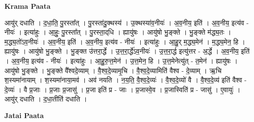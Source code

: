 \documentclass[17pt]{extarticle}
\begin{document}
\textbf{Krama Paata} \newline

आयु॑र् दधाति । द॒धा॒ति॒ पु॒रस्ता᳚त् । पु॒रस्ता॑दु॒क्थस्य॑ । उ॒क्थस्या॑व॒नीयः॑ । अ॒व॒नीय॒ इति॑ । अ॒व॒नीय॒ इत्य॑व - नीयः॑ । इत्या॑हुः । आ॒हुः॒ पु॒रस्ता᳚त् । पु॒रस्ता॒द्‌धि । ह्यायु॑षः । आयु॑षो भु॒ङ्‍क्ते । भु॒ङ्‍क्ते म॑द्ध्य॒तः । म॒द्ध्य॒तो॑ऽव॒नीयः॑ । अ॒व॒नीय॒ इति॑ । अ॒व॒नीय॒ इत्य॑व - नीयः॑ । इत्या॑हुः । आ॒हु॒र् म॒द्ध्य॒मेन॑ । म॒द्ध्य॒मेन॒ हि । ह्यायु॑षः । आयु॑षो भु॒ङ्‍क्ते । भु॒ङ्‍क्त उ॑त्तरा॒र्द्धे । उ॒त्त॒रा॒र्द्धे॑ऽव॒नीयः॑ । उ॒त्त॒रा॒र्द्ध इत्यु॑त्तर - अ॒र्द्धे । अ॒व॒नीय॒ इति॑ । अ॒व॒नीय॒ इत्य॑व - नीयः॑ । इत्या॑हुः । आ॒हु॒रु॒त्त॒मेन॑ । उ॒त्त॒मेन॒ हि । उ॒त्त॒मेनेत्यु॑त् - त॒मेन॑ । ह्यायु॑षः । आयु॑षो भु॒ङ्‍क्ते । भु॒ङ्‍क्ते वै᳚श्वदे॒व्याम् । वै॒श्व॒दे॒व्यामृ॒चि । वै॒श्व॒दे॒व्यामिति॑ वैश्व - दे॒व्याम् । ऋ॒चि श॒स्यमा॑नायाम् । श॒स्यमा॑नाया॒मव॑ । अव॑ नयति । न॒य॒ति॒ वै॒श्व॒दे॒व्यः॑ । वै॒श्व॒दे॒व्यो॑ वै । वै॒श्व॒दे॒व्य॑ इति॑ वैश्व - दे॒व्यः॑ । वै प्र॒जाः । प्र॒जाः प्र॒जासु॑ । प्र॒जा इति॑ प्र - जाः । प्र॒जास्वे॒व । प्र॒जास्विति॑ प्र - जासु॑ । ए॒वायुः॑ । आयु॑र् दधाति । द॒धा॒तीति॑ दधाति । \newline

\textbf{Jatai Paata} \newline
\end{document}
